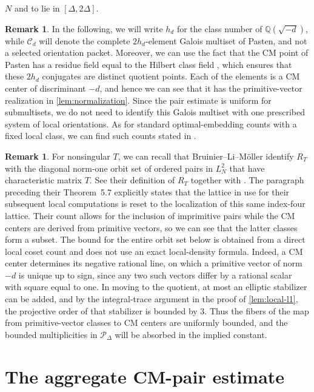 \documentclass[11pt,reqno]{amsart}
\theoremstyle{definition}
\newtheorem{remark}[theorem]{Remark}
\newcommand{\Q}{\mathbb Q}
\begin{document}
$N$ and to lie in $[\Delta,2\Delta]$.

\begin{remark}\label{rem:galois-packet} In the following, we will write
$h_d$ for the class number of $\Q(\sqrt{-d})$, while $\mathscr C_d$ will
denote the complete $2h_d$-element Galois multiset of Pasten, and not a
selected orientation packet. Moreover, we can use the fact that the CM point of Pasten has a residue
field equal to the Hilbert class field \cite[Section 13.1]{Pasten}, which
ensures that these $2h_d$ conjugates are distinct quotient points. Each of the elements is a CM center of discriminant $-d$, and hence we can
see that it has the primitive-vector realization in
\cref{lem:normalization}. Since the pair estimate is uniform for submultisets, we do not need to
identify this Galois multiset with one prescribed system of local
orientations. As for standard optimal-embedding counts with a fixed local class, we can
find such counts stated in \cite[Theorem 2.5]{PadurariuSaia}.
\end{remark} \begin{remark}\label{rem:pair-formula} For nonsingular $T$, we
can recall that Bruinier--Li--M\"oller identify $R_T$ with the diagonal
norm-one orbit set of ordered pairs in $L_N^2$ that have characteristic
matrix $T$. See their
definition of $R_T$ together with \cite[Equation
(2.9)]{BruinierLiMoller}. The paragraph preceding their Theorem~5.7 explicitly states that the lattice
in use for their subsequent local computations is reset to the localization
of this same index-four lattice. Their count allows for the inclusion of imprimitive pairs while the CM
centers are derived from primitive vectors, so we can see that the latter
classes form a subset. The bound for the entire orbit set below is obtained
from a direct local coset count and does not use an exact local-density
formula.
Indeed, a CM center determines its negative rational line, on which a
primitive vector of norm $-d$ is unique up to sign, since any two such
vectors differ by a rational scalar with square equal to one. In moving to the quotient, at most an elliptic
stabilizer can be added, and by the integral-trace argument in the proof
of \cref{lem:local-l1}, the projective order of that stabilizer is bounded by $3$. Thus the fibers of the map from primitive-vector
classes to CM centers are uniformly bounded, and the bounded multiplicities
in $\mathscr P_\Delta$ will be absorbed in the implied constant.
\end{remark}

\section{The aggregate CM-pair estimate}\label{sec:pair}
\end{document}
